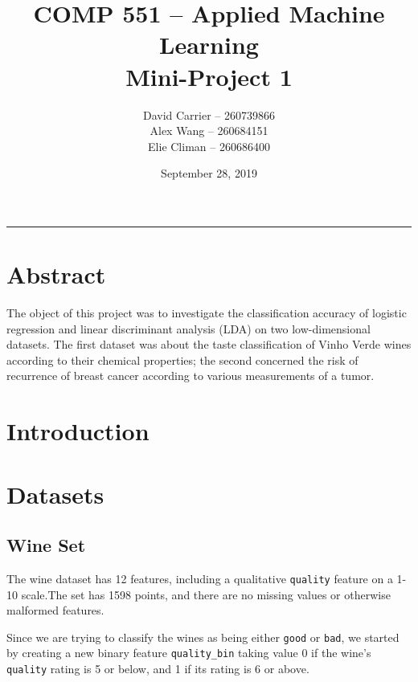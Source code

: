 \documentclass[11pt,letterpaper]{article}
\begin{document}
    \author{David Carrier -- 260739866 \\
        Alex Wang -- 260684151 \\
        Elie Climan -- 260686400}
    \date{September 28, 2019}
    \title{COMP 551 -- Applied Machine Learning \\
    Mini-Project 1}

        \thispagestyle{empty}
        \maketitle
        \vfill
    
    \noindent\rule{0.3\textwidth}{1pt}   
    \section*{Abstract}

        The object of this project was to investigate the classification accuracy of logistic regression and linear discriminant analysis (LDA) on two low-dimensional datasets. The first dataset was about the taste classification of Vinho Verde wines according to their chemical properties; the second concerned the risk of recurrence of breast cancer according to various measurements of a tumor.
        

    \newpage
    \section{Introduction}
    
    \section{Datasets}
    
    \subsection{Wine Set}
    
    The wine dataset has 12 features, including a qualitative \texttt{quality} feature on a 1-10 scale.The set has 1598 points, and there are no missing values or otherwise malformed features.
    
    Since we are trying to classify the wines as being either \texttt{good} or \texttt{bad}, we started by creating a new binary feature \texttt{quality\_bin} taking value 0 if the wine's \texttt{quality} rating is 5 or below, and 1 if its rating is 6 or above.
    
\end{document}
